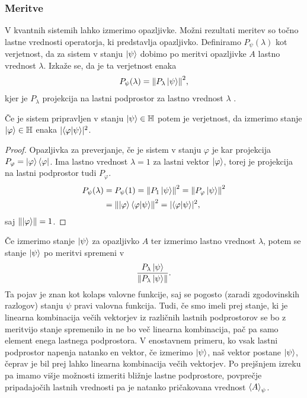 \documentclass[mat1]{fmfdelo}
\newcommand{\Hb}{\mathbb H}
\begin{document}
\subsubsection{Meritve}
V kvantnih sistemih lahko izmerimo opazljivke. Možni rezultati meritev so točno lastne vrednosti operatorja, ki predstavlja opazljivko. Definiramo \(P_\psi(\lambda)\) kot verjetnost, da za sistem v stanju \(\ket\psi\) dobimo po meritvi opazljivke \(A\) lastno vrednost \(\lambda\). Izkaže se, da je ta verjetnost enaka 
\begin{align*}
    P_\psi(\lambda) = \norm{P_\lambda \ket\psi}^2,
\end{align*}
kjer je \(P_\lambda\) projekcija na lastni podprostor za lastno vrednost \(\lambda\) \cite[Poglavje 2.3.1]{mathforqm}.

\begin{izrek}
    Če je sistem pripravljen v stanju \(\ket\psi \in \Hb\) potem je verjetnost, da izmerimo stanje \(\ket\varphi \in \Hb\) enaka \(\lvert \braket{\varphi}{\psi}\rvert^2\).
\end{izrek}
\begin{proof}
    Opazljivka za preverjanje, če je sistem v stanju \(\varphi\) je kar projekcija \(P_\varphi = \ket\varphi \bra\varphi\). Ima lastno vrednost \(\lambda=1\) za lastni vektor \(\ket\varphi\), torej je projekcija na lastni podprostor tudi \(P_\varphi\).
    \begin{align*}
        P_\psi (\lambda) &= P_\psi(1) =\norm{P_1\ket\psi}^2 = \norm{P_\varphi\ket\psi}^2\\
                        &= \norm{\ket\varphi\braket{\varphi}{\psi}}^2 = \lvert \braket{\varphi}{\psi}\rvert^2,
    \end{align*}
    saj \(\norm{\ket\varphi} = 1\).
\end{proof}

Če izmerimo stanje \(\ket\psi\) za opazljivko \(A\) ter izmerimo lastno vrednost \(\lambda\), potem se stanje \(\ket\psi\) po meritvi spremeni v
\begin{align*}
    \frac{P_\lambda \ket\psi}{\norm{P_\lambda\ket\psi}}.
\end{align*}
Ta pojav je znan kot kolaps valovne funkcije, saj se pogosto (zaradi zgodovinskih razlogov) stanju \(\psi\) pravi valovna funkcija. Tudi, če smo imeli prej stanje, ki je linearna kombinacija večih vektorjev iz različnih lastnih podprostorov se bo z meritvijo stanje spremenilo in ne bo več linearna kombinacija, pač pa samo element enega lastnega podprostora. V enostavnem primeru, ko vsak lastni podprostor napenja natanko en vektor, če izmerimo \(\ket\psi\), naš vektor postane \(\ket\psi\), čeprav je bil prej lahko linearna kombinacija večih vektorjev. Po prejšnjem izreku pa imamo višje možnosti izmeriti bližnje lastne podprostore, povprečje pripadajočih lastnih vrednosti pa je natanko pričakovana vrednost \(\ev{A}_\psi\).
\end{document}

